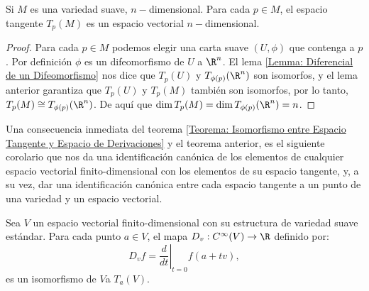 \begin{theorem}\label{Teorema: Invariancia de la Dimensión}
	Si $M$ es una variedad suave, $n-$dimensional. Para cada $p \in M$, el espacio tangente $T_p(M)$ es un espacio vectorial $n-$dimensional.
\end{theorem}

\begin{proof}
	Para cada $p \in M$ podemos elegir una carta suave $(U, \phi)$ que contenga a
  $p$. Por definición $\phi$ es un difeomorfismo de $U$ a $\R^n$. El lema
  \ref{Lemma: Diferencial de un Difeomorfismo} nos dice que $T_{p}(U)$ y
  $T_{\phi(p)}(\R^n)$ son isomorfos, y el lema anterior garantiza que $T_{p}(U)$
  y $T_{p}(M)$ también son isomorfos, por lo tanto, $T_{p}(M) \cong T_{\phi(p)}(\R^n)$. De aquí que $\dim T_p(M) = \dim T_{\phi(p)}(\R^n) = n$.
\end{proof}

Una consecuencia inmediata del teorema \ref{Teorema: Isomorfismo entre Espacio Tangente y Espacio de Derivaciones} y el teorema anterior, es el siguiente corolario que nos da una identificación canónica de los elementos de cualquier espacio vectorial finito-dimensional con los elementos de su espacio tangente, y, a su vez, dar una identificación canónica entre cada espacio tangente a un punto de una variedad y un espacio vectorial.

\begin{corollary}
	Sea $V$ un espacio vectorial finito-dimensional con su estructura de variedad suave estándar. Para cada punto $a \in V$, el mapa $D_v: C^{\infty}(V) \to \R$ definido por:
	\[D_vf = \left. \frac{d}{dt} \right|_{t=0} f(a+tv), \]
	es un isomorfismo de $V$a $T_a(V)$.
\end{corollary}
